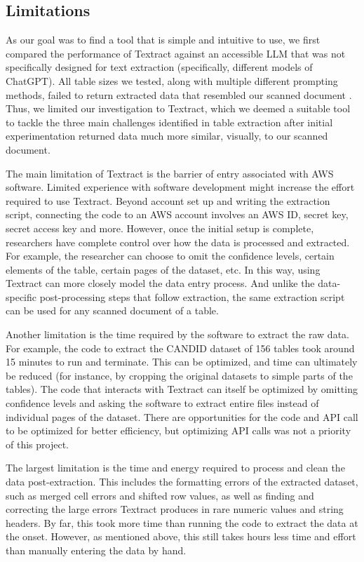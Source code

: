 \documentclass[12pt]{article}
\begin{document}
\subsection{Limitations}

As our goal was to find a tool that is simple and intuitive to use, we first compared the performance of Textract against an accessible LLM that was not specifically designed for text extraction (specifically, different models of ChatGPT). All table sizes we tested, along with multiple different prompting methods, failed to return extracted data that resembled our scanned document \cite{stewart}. Thus, we limited our investigation to Textract, which we deemed a suitable tool to tackle the three main challenges identified in table extraction after initial experimentation returned data much more similar, visually, to our scanned document. 

The main limitation of Textract is the barrier of entry associated with AWS software. Limited experience with software development might increase the effort required to use Textract. Beyond account set up and writing the extraction script, connecting the code to an AWS account involves an AWS ID, secret key, secret access key and more. However, once the initial setup is complete, researchers have complete control over how the data is processed and extracted. For example, the researcher can choose to omit the confidence levels, certain elements of the table, certain pages of the dataset, etc. In this way, using Textract can more closely model the data entry process. And unlike the data-specific post-processing steps that follow extraction, the same extraction script can be used for any scanned document of a table.

Another limitation is the time required by the software to extract the raw data. For example, the code to extract the CANDID dataset of 156 tables took around 15 minutes to run and terminate. This can be optimized, and time can ultimately be reduced (for instance, by cropping the original datasets to simple parts of the tables). The code that interacts with Textract can itself be optimized by omitting confidence levels and asking the software to extract entire files instead of individual pages of the dataset. There are opportunities for the code and API call to be optimized for better efficiency, but optimizing API calls was not a priority of this project. 


The largest limitation is the time and energy required to process and clean the data post-extraction. This includes the formatting errors of the extracted dataset, such as merged cell errors and shifted row values, as well as finding and correcting the large errors Textract produces in rare numeric values and string headers. By far, this took more time than running the code to extract the data at the onset. However, as mentioned above, this still takes hours less time and effort than manually entering the data by hand. 
\end{document}
